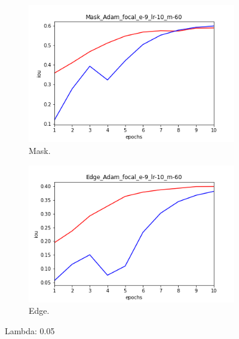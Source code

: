 \documentclass[a4paper]{article}
\begin{document}
\begin{figure}[h]
    \centering
    \begin{subfigure}[b]{0.45\textwidth}
        \includegraphics[width=\textwidth]{imgs/lambda/5/Mask_Adam_focal_e-9_lr-10_m-60_13_May_2022-22:32.png}
        \caption{Mask.}
    \end{subfigure}
    \hfill
    \begin{subfigure}[b]{0.45\textwidth}
        \includegraphics[width=\textwidth]{imgs/lambda/5/Edge_Adam_focal_e-9_lr-10_m-60_13_May_2022-22:32.png}
        \caption{Edge.}
    \end{subfigure}
    \caption{Lambda: 0.05}
\end{figure}
\end{document}
